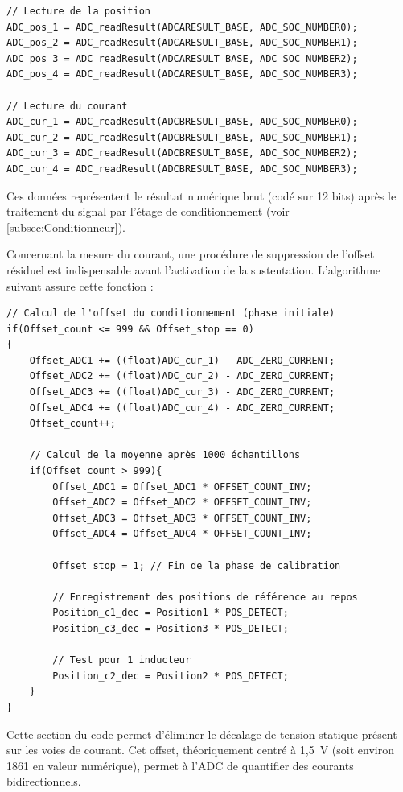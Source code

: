 \begin{verbatim}
// Lecture de la position
ADC_pos_1 = ADC_readResult(ADCARESULT_BASE, ADC_SOC_NUMBER0);
ADC_pos_2 = ADC_readResult(ADCARESULT_BASE, ADC_SOC_NUMBER1);
ADC_pos_3 = ADC_readResult(ADCARESULT_BASE, ADC_SOC_NUMBER2);
ADC_pos_4 = ADC_readResult(ADCARESULT_BASE, ADC_SOC_NUMBER3);

// Lecture du courant
ADC_cur_1 = ADC_readResult(ADCBRESULT_BASE, ADC_SOC_NUMBER0);
ADC_cur_2 = ADC_readResult(ADCBRESULT_BASE, ADC_SOC_NUMBER1);
ADC_cur_3 = ADC_readResult(ADCBRESULT_BASE, ADC_SOC_NUMBER2);
ADC_cur_4 = ADC_readResult(ADCBRESULT_BASE, ADC_SOC_NUMBER3);
\end{verbatim}

Ces données représentent le résultat numérique brut (codé sur 12 bits) après le traitement du signal par l'étage de conditionnement (voir \ref{subsec:Conditionneur}).

Concernant la mesure du courant, une procédure de suppression de l'offset résiduel est indispensable avant l'activation de la sustentation. L'algorithme suivant assure cette fonction :

\begin{verbatim}
// Calcul de l'offset du conditionnement (phase initiale)
if(Offset_count <= 999 && Offset_stop == 0)
{
    Offset_ADC1 += ((float)ADC_cur_1) - ADC_ZERO_CURRENT;
    Offset_ADC2 += ((float)ADC_cur_2) - ADC_ZERO_CURRENT;
    Offset_ADC3 += ((float)ADC_cur_3) - ADC_ZERO_CURRENT;
    Offset_ADC4 += ((float)ADC_cur_4) - ADC_ZERO_CURRENT;
    Offset_count++;

    // Calcul de la moyenne après 1000 échantillons
    if(Offset_count > 999){
        Offset_ADC1 = Offset_ADC1 * OFFSET_COUNT_INV;
        Offset_ADC2 = Offset_ADC2 * OFFSET_COUNT_INV;
        Offset_ADC3 = Offset_ADC3 * OFFSET_COUNT_INV;
        Offset_ADC4 = Offset_ADC4 * OFFSET_COUNT_INV;

        Offset_stop = 1; // Fin de la phase de calibration

        // Enregistrement des positions de référence au repos
        Position_c1_dec = Position1 * POS_DETECT;
        Position_c3_dec = Position3 * POS_DETECT;

        // Test pour 1 inducteur
        Position_c2_dec = Position2 * POS_DETECT;
    }
}
\end{verbatim}

Cette section du code permet d'éliminer le décalage de tension statique présent sur les voies de courant. Cet offset, théoriquement centré à 1,5~V (soit environ 1861 en valeur numérique), permet à l'ADC de quantifier des courants bidirectionnels.

